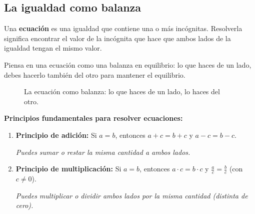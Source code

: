 \documentclass[12pt, letterpaper]{article}
\begin{document}
\subsection{La igualdad como balanza}

Una \textbf{ecuación} es una igualdad que contiene una o más incógnitas. Resolverla significa encontrar el valor de la incógnita que hace que ambos lados de la igualdad tengan el mismo valor.

Piensa en una ecuación como una balanza en equilibrio: lo que haces de un lado, debes hacerlo también del otro para mantener el equilibrio.

\begin{figure}[h!]
  \centering
  \caption{La ecuación como balanza: lo que haces de un lado, lo haces del otro.}
  \label{fig:balanza}
\end{figure}

\begin{cuadroteoria}
  \textbf{Principios fundamentales para resolver ecuaciones:}
  \begin{enumerate}[leftmargin=*, label=\arabic*.]
    \item \textbf{Principio de adición:} Si $a = b$, entonces $a + c = b + c$ y $a - c = b - c$.

          \textit{Puedes sumar o restar la misma cantidad a ambos lados.}

    \item \textbf{Principio de multiplicación:} Si $a = b$, entonces $a \cdot c = b \cdot c$ y $\frac{a}{c} = \frac{b}{c}$ (con $c \neq 0$).

          \textit{Puedes multiplicar o dividir ambos lados por la misma cantidad (distinta de cero).}
  \end{enumerate}
\end{cuadroteoria}
\end{document}
